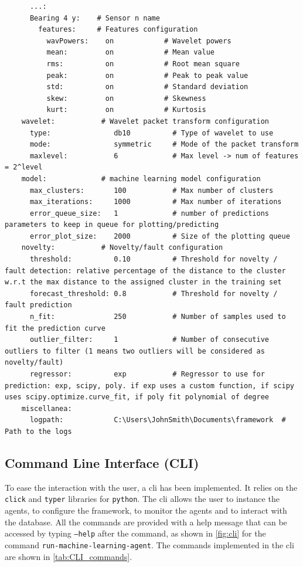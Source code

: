 \begin{verbatim}
      ...:
      Bearing 4 y:    # Sensor n name
        features:     # Features configuration
          wavPowers:    on            # Wavelet powers
          mean:         on            # Mean value
          rms:          on            # Root mean square
          peak:         on            # Peak to peak value
          std:          on            # Standard deviation
          skew:         on            # Skewness
          kurt:         on            # Kurtosis
    wavelet:           # Wavelet packet transform configuration
      type:               db10          # Type of wavelet to use
      mode:               symmetric     # Mode of the packet transform
      maxlevel:           6             # Max level -> num of features = 2^level
    model:             # machine learning model configuration
      max_clusters:       100           # Max number of clusters
      max_iterations:     1000          # Max number of iterations
      error_queue_size:   1             # number of predictions parameters to keep in queue for plotting/predicting
      error_plot_size:    2000          # Size of the plotting queue
    novelty:           # Novelty/fault configuration
      threshold:          0.10          # Threshold for novelty / fault detection: relative percentage of the distance to the cluster w.r.t the max distance to the assigned cluster in the training set
      forecast_threshold: 0.8           # Threshold for novelty / fault prediction
      n_fit:              250           # Number of samples used to fit the prediction curve
      outlier_filter:     1             # Number of consecutive outliers to filter (1 means two outliers will be considered as novelty/fault)
      regressor:          exp           # Regressor to use for prediction: exp, scipy, poly. if exp uses a custom function, if scipy uses scipy.optimize.curve_fit, if poly fit polynomial of degree
    miscellanea:
      logpath:            C:\Users\JohnSmith\Documents\framework  # Path to the logs
\end{verbatim}

\subsection{Command Line Interface (CLI)}
\label{subsec:CLI}

To ease the interaction with the user, a \gls{cli} has been implemented. It relies on the \texttt{click} and \texttt{typer} libraries for \texttt{python}. The \gls{cli} allows the user to instance the agents, to configure the framework, to monitor the agents and to interact with the database. All the commands are provided with a help message that can be accessed by typing \texttt{--help} after the command, as shown in \autoref{fig:cli} for the command \texttt{run-machine-learning-agent}.
The commands implemented in the \gls{cli} are shown in \autoref{tab:CLI_commands}.


